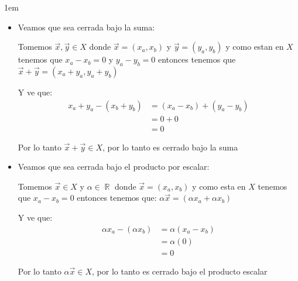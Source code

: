 \documentclass[12pt, fleqn]{article}                             %
\newenvironment{SmallIndentation}[1][0.75em]                    %
        {\begin{adjustwidth}{#1}{}\begin{footnotesize}}             %
        {\end{footnotesize}\end{adjustwidth}}                       %
\theoremstyle{break}                                            %
\DeclareMathOperator \Reals        {\mathbb{R}}                 %
\begin{document}
\begin{itemize}
\begin{SmallIndentation}[1em]
\begin{itemize}
                        \item
                            Veamos que sea cerrada bajo la suma:

                            Tomemos $\vec x, \vec y \in X$ donde $\vec x = (x_a, x_b)$ y $\vec y = (y_a, y_b)$
                            y como estan en $X$ tenemos que $x_a - x_b = 0$ y $y_a - y_b = 0$ entonces
                            tenemos que $\vec x + \vec y = (x_a + y_a, y_a + y_b)$

                            Y ve que:
                            \begin{align*}
                                x_a + y_a - (x_b + y_b)
                                    &= (x_a - x_b) + (y_a - y_b)        \\
                                    &= 0 + 0                            \\
                                    &= 0
                            \end{align*}

                            Por lo tanto $\vec x + \vec y \in X$, por lo tanto es cerrado bajo la suma

                        \item
                            Veamos que sea cerrada bajo el producto por escalar:

                            Tomemos $\vec x \in X$ y $\alpha \in \Reals$ donde $\vec x = (x_a, x_b)$ y como
                            esta en $X$ tenemos que $x_a - x_b = 0$ entonces tenemos que:
                            $\alpha \vec x = (\alpha x_a + \alpha x_b)$

                            Y ve que:
                            \begin{align*}
                                \alpha x_a - (\alpha x_b)
                                    &= \alpha (x_a - x_b)               \\
                                    &= \alpha (0)                       \\
                                    &= 0
                            \end{align*}

                            Por lo tanto $\alpha \vec x \in X$, por lo tanto es cerrado bajo el producto escalar

                    \end{itemize}

                \end{SmallIndentation}

        \end{itemize}
\end{document}
